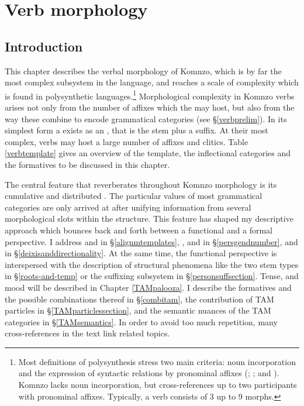 
\chapter{Verb morphology} \label{cha:verb morphology}

\section{Introduction} \label{verbmorphintro}

This chapter describes the verbal morphology of Komnzo, which is by far the most complex subsystem in the language, and reaches a scale of complexity which is found in polysynthetic languages.\footnote{Most definitions of polysynthesis stress two main criteria: noun incorporation and the expression of syntactic relations by pronominal affixes (\citealt[16]{Baker:1996poly}; \citealt[2]{Evans:2002sasse}; and \citealt{Mithun:2009wh}). Komnzo lacks noun incorporation, but cross-references up to two participants with pronominal affixes. Typically, a verb consists of 3 up to 9 morphs.} Morphological complexity in Komnzo verbs arises not only from the number of affixes which the  may host, but also from the way these combine to encode grammatical categories (see \S{}\ref{verbprelim}). In its simplest form a  exists as an , that is the stem plus a  suffix. At their most complex, verbs may host a large number of affixes and clitics. Table \ref{verbtemplate} gives an overview of the  template, the inflectional categories and the formatives to be discussed in this chapter.%

The central feature that reverberates throughout Komnzo  morphology is its cumulative and distributed . The particular values of most grammatical categories are only arrived at after unifying information from several morphological slots within the  structure. This feature has shaped my descriptive approach which bounces back and forth between a functional and a formal perspective. I address  and  in \S{}\ref{alignmtemplates}, ,  and  in \S{}\ref{persgendnumber},  and  in \S{}\ref{deixisanddirectionality}. At the same time, the functional perspective is interspersed with the description of structural phenomena like the two stem types in \S{}\ref{roots-and-temp} or the suffixing subsystem in \S{}\ref{personsuffsection}. Tense,  and mood will be described in Chapter \ref{TAMpalooza}. I describe the formatives and the possible combinations thereof in \S{}\ref{combitam}, the contribution of TAM particles in \S{}\ref{TAMparticlessection}, and the semantic nuances of the TAM categories in \S{}\ref{TAMsemantics}. In order to avoid too much repetition, many cross-references in the text link related topics.

